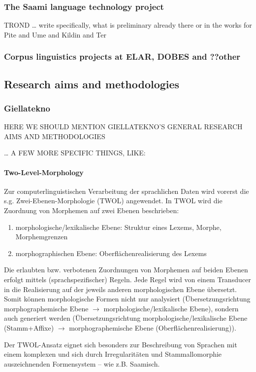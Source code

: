 \documentclass[a4paper,12pt]{article}
\begin{document}
\subsubsection{The Saami language technology project}
TROND … write specifically, what is preliminary already there or in the works for Pite and Ume and Kildin and Ter

\subsubsection{Corpus linguistics projects at ELAR, DOBES and ??other}

\subsection{Research aims and methodologies}

\subsubsection{Giellatekno} HERE WE SHOULD MENTION GIELLATEKNO'S GENERAL RESEARCH AIMS AND METHODOLOGIES

… A FEW MORE SPECIFIC THINGS, LIKE:
\paragraph{Two-Level-Morphology}
Zur computerlinguistischen Verarbeitung der sprachlichen Daten wird vorerst die s.g. Zwei-Ebenen-Morphologie (TWOL) angewendet. In TWOL wird die Zuordnung von Morphemen auf zwei Ebenen beschrieben:
\begin{enumerate}
\item morphologische/lexikalische Ebene: Struktur eines Lexems, Morphe, Morphemgrenzen
\item morphographischen Ebene: Oberflächenrealisierung des Lexems
\end{enumerate}
Die erlaubten bzw. verbotenen Zuordnungen von Morphemen auf beiden Ebenen erfolgt mittels (sprachspezifischer) Regeln. Jede Regel wird von einem Transducer in die Realisierung auf der jeweils anderen morphologischen Ebene übersetzt. Somit können morphologische Formen nicht nur analysiert (Übersetzungsrichtung morphographemische Ebene $\rightarrow$ morphologische/lexikalische Ebene), sondern auch generiert werden (Übersetzungsrichtung morphologische/lexikalische Ebene (Stamm+Affixe) $\rightarrow$ morphographemische Ebene (Oberflächenrealisierung)).

Der TWOL-Ansatz eignet sich besonders zur Beschreibung von Sprachen mit einem komplexen und sich durch Irregularitäten und Stammallomorphie auszeichnenden Formensystem – wie z.B. Saamisch. 
\end{document}
